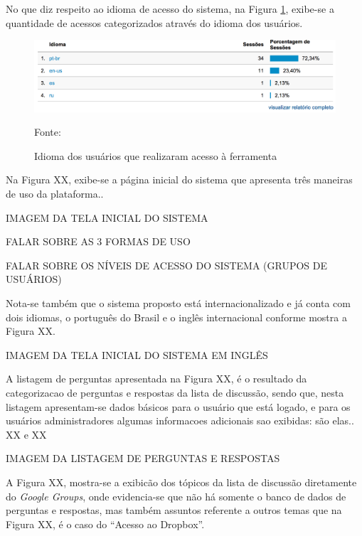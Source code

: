 \FloatBarrier 	%

No que diz respeito ao idioma de acesso do sistema, na Figura
\ref{fig:googleAnalyticsIdioma}, exibe-se a quantidade de acessos categorizados
através do idioma dos usuários.

\begin{figure}[h!tb]
	\caption{Idioma dos usuários que realizaram acesso à ferramenta}
	\label{fig:googleAnalyticsIdioma}

	\centering
	\includegraphics[width=\textwidth]{images/resultados/google-analytics-idioma.png}

	\centering
	\footnotesize Fonte: \fonteOAutor
\end{figure}

\FloatBarrier 	%





Na Figura XX, exibe-se a página inicial do sistema que apresenta três maneiras
de uso da plataforma.. 

IMAGEM DA TELA INICIAL DO SISTEMA

FALAR SOBRE AS 3 FORMAS DE USO

FALAR SOBRE OS NÍVEIS DE ACESSO DO SISTEMA (GRUPOS DE USUÁRIOS)

Nota-se também que o sistema proposto está internacionalizado e já conta com
dois idiomas, o português do Brasil e o inglês internacional conforme mostra a
Figura XX.

IMAGEM DA TELA INICIAL DO SISTEMA EM INGLÊS

A listagem de perguntas apresentada na Figura XX, é o resultado da categorizacao
de perguntas e respostas da lista de discussão, sendo que, nesta listagem
apresentam-se dados básicos para o usuário que está logado, e para os usuários
administradores algumas informacoes adicionais sao exibidas: são elas.. XX e XX

IMAGEM DA LISTAGEM DE PERGUNTAS E RESPOSTAS

A Figura XX, mostra-se a exibicão dos tópicos da lista de discussão diretamente
do \textit{Google Groups}, onde evidencia-se que não há somente o banco de dados
de perguntas e respostas, mas também assuntos referente a outros temas que na
Figura XX, é o caso do ``Acesso ao Dropbox''.

